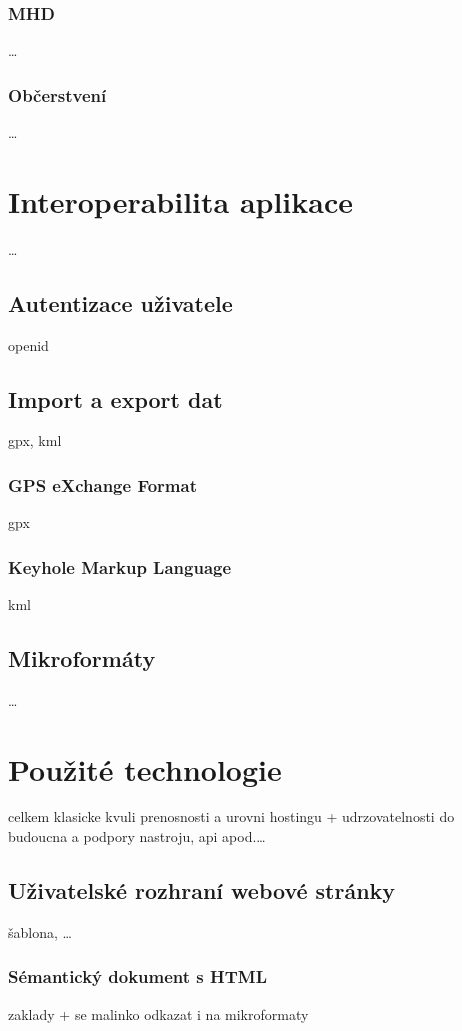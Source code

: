 \subsection{MHD}
\ldots
\subsection{Občerstvení}
\ldots

\chapter{Interoperabilita aplikace}
\ldots

\section{Autentizace uživatele}
openid

\section{Import a export dat}
gpx, kml
\subsection{GPS eXchange Format}
gpx
\subsection{Keyhole Markup Language}
kml

\section{Mikroformáty}
\ldots

\chapter{Použité technologie}
celkem klasicke kvuli prenosnosti a urovni hostingu +
udrzovatelnosti do budoucna a podpory nastroju, api apod.\ldots

\section{Uživatelské rozhraní webové stránky}
šablona, \ldots
\subsection{Sémantický dokument s HTML}
zaklady + se malinko odkazat i na mikroformaty

